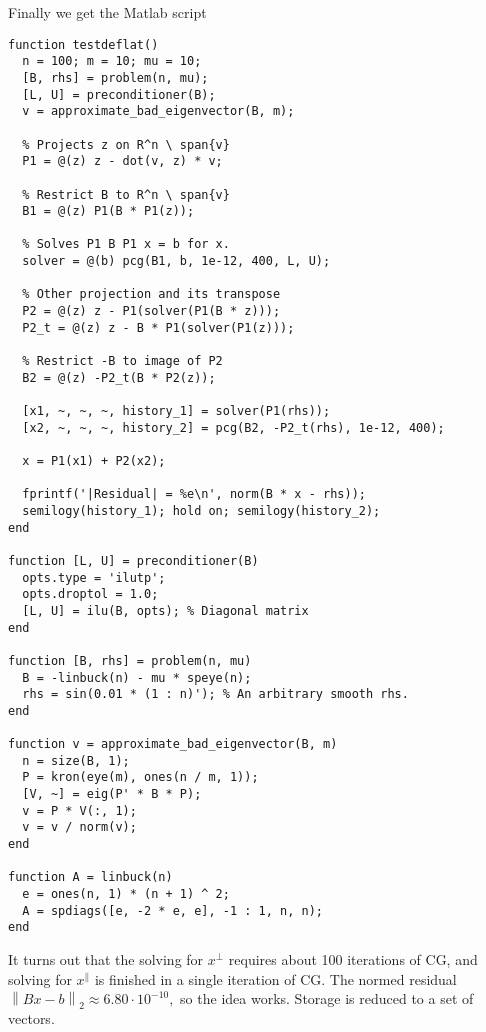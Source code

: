 \documentclass[a4paper]{article}
\newcommand{\norm}[1]{\left\lVert#1\right\rVert}
\begin{document}
  \newpage
  Finally we get the Matlab script
\begin{lstlisting}
function testdeflat()
  n = 100; m = 10; mu = 10;
  [B, rhs] = problem(n, mu);
  [L, U] = preconditioner(B);
  v = approximate_bad_eigenvector(B, m);

  % Projects z on R^n \ span{v}
  P1 = @(z) z - dot(v, z) * v;

  % Restrict B to R^n \ span{v}
  B1 = @(z) P1(B * P1(z));

  % Solves P1 B P1 x = b for x.
  solver = @(b) pcg(B1, b, 1e-12, 400, L, U);

  % Other projection and its transpose
  P2 = @(z) z - P1(solver(P1(B * z)));
  P2_t = @(z) z - B * P1(solver(P1(z)));

  % Restrict -B to image of P2
  B2 = @(z) -P2_t(B * P2(z));
  
  [x1, ~, ~, ~, history_1] = solver(P1(rhs));
  [x2, ~, ~, ~, history_2] = pcg(B2, -P2_t(rhs), 1e-12, 400);

  x = P1(x1) + P2(x2); 
  
  fprintf('|Residual| = %e\n', norm(B * x - rhs));
  semilogy(history_1); hold on; semilogy(history_2);
end

function [L, U] = preconditioner(B)
  opts.type = 'ilutp';
  opts.droptol = 1.0;
  [L, U] = ilu(B, opts); % Diagonal matrix
end

function [B, rhs] = problem(n, mu)
  B = -linbuck(n) - mu * speye(n);  
  rhs = sin(0.01 * (1 : n)'); % An arbitrary smooth rhs.
end

function v = approximate_bad_eigenvector(B, m)
  n = size(B, 1);
  P = kron(eye(m), ones(n / m, 1));
  [V, ~] = eig(P' * B * P);
  v = P * V(:, 1);
  v = v / norm(v);
end

function A = linbuck(n)
  e = ones(n, 1) * (n + 1) ^ 2;
  A = spdiags([e, -2 * e, e], -1 : 1, n, n);
end
\end{lstlisting}
  It turns out that the solving for $x^\perp$ requires about 100 iterations of CG, and solving for $x^\|$ is finished in a single iteration of CG. The normed residual $\norm{Bx - b}_2 \approx 6.80\cdot10^{-10},$ so the idea works. Storage is reduced to a set of vectors.
\end{document}
